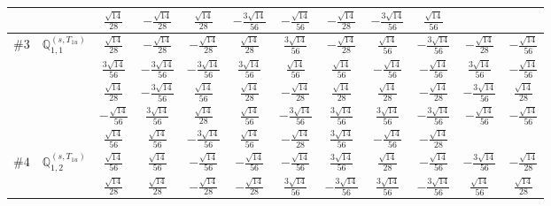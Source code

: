 \documentclass[fleqn,9pt,landscape]{jsarticle}
\begin{document}
\begin{center}
\begin{longtable}{lcccccccccc}
& $ \frac{\sqrt{14}}{28} $ & $ - \frac{\sqrt{14}}{28} $ & $ \frac{\sqrt{14}}{28} $ & $ - \frac{3 \sqrt{14}}{56} $ & $ - \frac{\sqrt{14}}{56} $ & $ - \frac{\sqrt{14}}{28} $ & $ - \frac{3 \sqrt{14}}{56} $ & $ \frac{\sqrt{14}}{56} $ & $  $ & $  $ \\ \hline
$ \#3\quad \mathbb{Q}_{1,1}^{(s,T_{1u})} $ & $ \frac{\sqrt{14}}{28} $ & $ - \frac{\sqrt{14}}{28} $ & $ - \frac{\sqrt{14}}{28} $ & $ \frac{\sqrt{14}}{28} $ & $ \frac{3 \sqrt{14}}{56} $ & $ - \frac{\sqrt{14}}{28} $ & $ \frac{\sqrt{14}}{56} $ & $ - \frac{3 \sqrt{14}}{56} $ & $ - \frac{\sqrt{14}}{28} $ & $ - \frac{\sqrt{14}}{56} $ \\
& $ \frac{3 \sqrt{14}}{56} $ & $ - \frac{3 \sqrt{14}}{56} $ & $ - \frac{3 \sqrt{14}}{56} $ & $ \frac{3 \sqrt{14}}{56} $ & $ \frac{\sqrt{14}}{56} $ & $ \frac{\sqrt{14}}{56} $ & $ - \frac{\sqrt{14}}{56} $ & $ - \frac{\sqrt{14}}{56} $ & $ \frac{3 \sqrt{14}}{56} $ & $ - \frac{\sqrt{14}}{56} $ \\
& $ \frac{\sqrt{14}}{28} $ & $ - \frac{3 \sqrt{14}}{56} $ & $ \frac{\sqrt{14}}{56} $ & $ \frac{\sqrt{14}}{28} $ & $ - \frac{\sqrt{14}}{28} $ & $ \frac{\sqrt{14}}{28} $ & $ \frac{\sqrt{14}}{28} $ & $ - \frac{\sqrt{14}}{28} $ & $ - \frac{3 \sqrt{14}}{56} $ & $ \frac{\sqrt{14}}{28} $ \\
& $ - \frac{\sqrt{14}}{56} $ & $ \frac{3 \sqrt{14}}{56} $ & $ \frac{\sqrt{14}}{28} $ & $ \frac{\sqrt{14}}{56} $ & $ - \frac{3 \sqrt{14}}{56} $ & $ \frac{3 \sqrt{14}}{56} $ & $ \frac{3 \sqrt{14}}{56} $ & $ - \frac{3 \sqrt{14}}{56} $ & $ - \frac{\sqrt{14}}{56} $ & $ - \frac{\sqrt{14}}{56} $ \\
& $ \frac{\sqrt{14}}{56} $ & $ \frac{\sqrt{14}}{56} $ & $ - \frac{3 \sqrt{14}}{56} $ & $ \frac{\sqrt{14}}{56} $ & $ - \frac{\sqrt{14}}{28} $ & $ \frac{3 \sqrt{14}}{56} $ & $ - \frac{\sqrt{14}}{56} $ & $ - \frac{\sqrt{14}}{28} $ & $  $ & $  $ \\ \hline
$ \#4\quad \mathbb{Q}_{1,2}^{(s,T_{1u})} $ & $ \frac{\sqrt{14}}{56} $ & $ \frac{\sqrt{14}}{56} $ & $ - \frac{\sqrt{14}}{56} $ & $ - \frac{\sqrt{14}}{56} $ & $ - \frac{\sqrt{14}}{56} $ & $ \frac{3 \sqrt{14}}{56} $ & $ \frac{\sqrt{14}}{28} $ & $ - \frac{\sqrt{14}}{56} $ & $ - \frac{3 \sqrt{14}}{56} $ & $ - \frac{\sqrt{14}}{28} $ \\
& $ \frac{\sqrt{14}}{28} $ & $ \frac{\sqrt{14}}{28} $ & $ - \frac{\sqrt{14}}{28} $ & $ - \frac{\sqrt{14}}{28} $ & $ \frac{3 \sqrt{14}}{56} $ & $ - \frac{3 \sqrt{14}}{56} $ & $ \frac{3 \sqrt{14}}{56} $ & $ - \frac{3 \sqrt{14}}{56} $ & $ \frac{\sqrt{14}}{56} $ & $ \frac{\sqrt{14}}{28} $ \\

\end{longtable}
\end{center}
\end{document}

